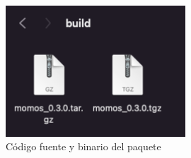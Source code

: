 \begin{figure}[H]
  \centering
    \begin{minipage}{0.6\textwidth}
      \centering
      \includegraphics[width=0.6\textwidth]{figure_4_26.png}
      \caption{C\'odigo fuente y binario del paquete}
      \label{fig:Fig}
    \end{minipage}%
    \hspace{5mm}
\end{figure}